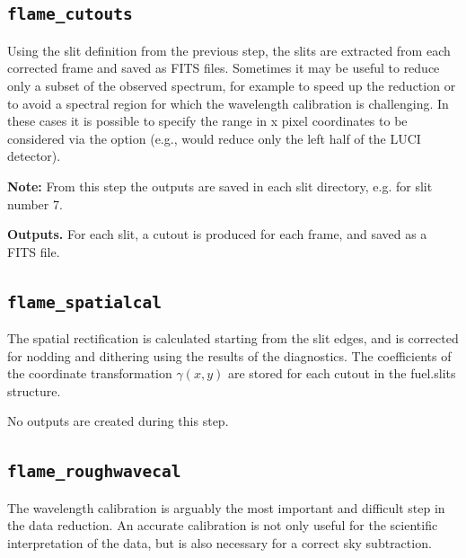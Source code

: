 \documentclass[a4paper]{article}
\begin{document}
\begin{sloppypar}
\subsection{\texttt{flame\_cutouts}}

Using the slit definition from the previous step, the slits are extracted from each corrected frame and saved as FITS files. Sometimes it may be useful to reduce only a subset of the observed spectrum, for example to speed up the reduction or to avoid a spectral region for which the wavelength calibration is challenging. In these cases it is possible to specify the range in x pixel coordinates to be considered via the  option (e.g.,  would reduce only the left half of the LUCI detector).

\medskip
\noindent
\textbf{Note:} From this step the outputs are saved in each slit directory, e.g.  for slit number 7.

\medskip
\noindent
\textbf{Outputs.} For each slit, a cutout is produced for each frame, and saved as a FITS file.

\subsection{\texttt{flame\_spatialcal}}

The spatial rectification is calculated starting from the slit edges, and is corrected for nodding and dithering using the results of the diagnostics. The coefficients of the coordinate transformation $\gamma(x,y)$ are stored for each cutout in the fuel.slits structure.

\medskip
\noindent
No outputs are created during this step.


\subsection{\texttt{flame\_roughwavecal}}

The wavelength calibration is arguably the most important and difficult step in the data reduction. An accurate calibration is not only useful for the scientific interpretation of the data, but is also necessary for a correct sky subtraction.


\end{sloppypar}
\end{document}
